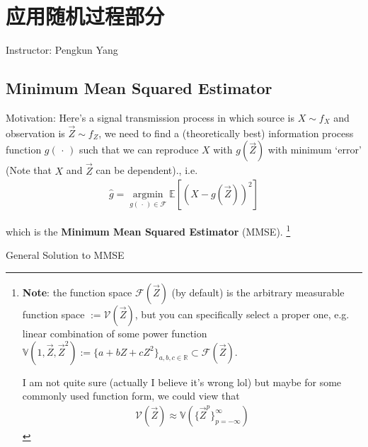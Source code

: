 \section{应用随机过程部分}
\begin{center}
    Instructor: Pengkun Yang 
\end{center}

    





\subsection{Minimum Mean Squared Estimator}\label{SubSecMMSE}
    Motivation: Here's a signal transmission process in which source is $ X\sim f_{X} $ and observation is $ \vec{Z}\sim f_Z $, we need to find a (theoretically best) information process function $ g(\, \cdot \, ) $ such that we can reproduce $ X $ with $ g(\vec{Z}) $ with minimum `error' (Note that $ X$ and $\vec{Z} $ can be dependent)., i.e.
    \begin{align}
        \hat{g}=\mathop{\arg\min}\limits_{g(\, \cdot \, )\in \mathscr{F}} \mathbb{E}\left[ (X-g(\vec{Z}))^2 \right] 
    \end{align}

    which is the \textbf{Minimum Mean Squared Estimator} (MMSE). \footnote{\textbf{Note}: the function space $ \mathscr{F}(\vec{Z}) $ (by default) is the arbitrary measurable function space $ :=\mathscr{V}(\vec{Z}) $, but you can specifically select a proper one, e.g. linear combination of some power function $ \mathbb{V}(1,\vec{Z},\vec{Z}^2):=\{a+bZ+cZ^2\}_{a,b,c\in\mathbb{R}}\subset \mathscr{F}(\vec{Z}) $.
    
    I am not quite sure (actually I believe it's wrong lol) but maybe for some commonly used function form, we could view that
    \begin{align}
        \mathscr{V}(\vec{Z})\approx \mathbb{V}(\{\vec{Z}^p\}_{p=-\infty}^\infty) 
    \end{align}
    
    }

\begin{point}
    General Solution to MMSE
\end{point}

